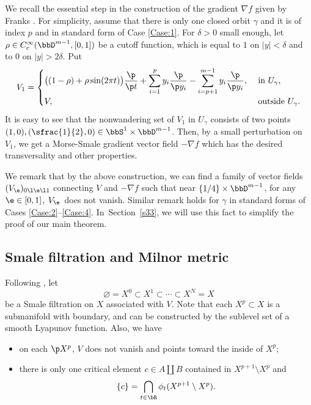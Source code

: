\begin{re}\label{reK}We recall the essential step in the
construction of the gradient $\nabla f$ given by Franks \cite[Prop.\,8.5]{Franks1982}. For simplicity, assume that there is only one
closed orbit $\gamma$ and it is of index $p$ and in standard
form of Case \ref{Case:1}.
For $\delta>0$ small enough, let $\rho\in
C^{\infty}_{c}(\bbD^{m-1},[0,1])$
be a cutoff function, which is equal to
$1$ on $|y|<\delta$ and to $0$ on $|y|>2\delta$. Put
\begin{equation*}
V_{1}=
\begin{cases}
\displaystyle
\big((1-\rho)+\rho\sin(2\pi t)\big)\frac{\p}{\p t}+\sum_{i=1}^{p}y_{i}\frac{\p}{\p
y_{i}}-\sum_{i=p+1}^{m-1}y_{i}\frac{\p}{\p y_{i}}, &\hbox{ in
} U_{\gamma},\\
V,& \hbox{ outside } U_{\gamma}.
\end{cases}
\end{equation*}
It is easy to see that the
nonwandering set of $V_{1}$ in $U_{\gamma}$ consists of two
points $(1,0),(\sfrac{1}{2},0)\in
\bbS^{1}\times \bbD^{m-1}$. Then, by a small perturbation on $V_{1}$, we get a Morse-Smale gradient vector
field $-\nabla f$ which
has the desired transversality and other properties.

We remark that by the above construction, we can find a family of vector fields $(V_{\e})_{0\l\e\l1}$ connecting $V$ and
$-\nabla f$ such that near $\{1/4\}\times \bbD^{m-1}$, for
any $ \e\in [0,1]$, $V_{\e}$~does not vanish.
Similar remark holds for $\gamma$ in standard forms of Cases \ref{Case:2}--\ref{Case:4}.
In~Section~\ref{s33}, we will use this fact to simplify the proof of our main theorem.
\end{re}

\subsection{Smale filtration and Milnor metric}\label{sSF}
Following \cite[Def.\,9.10]{Franks1982},
let
\begin{equation}\label{eqSmale}
\varnothing=X^{0}\subset X^{1}\subset\cdots \subset X^{N}=X
\end{equation}
be a Smale filtration on $X$ associated with $V$. Note that each
$X^{p}\subset X$ is a submanifold with boundary, and can be constructed by the sublevel set of a smooth Lyapunov function. Also, we
have
\begin{itemize}
\item on each $\p X^{p}$, $V$ does not vanish and points toward the inside of $X^{p}$;
\item there is only one critical element $c\in A\coprod
B$ contained in $X^{p+1}\setminus
X^{p}$ and
\begin{equation*}
\{c\}=\bigcap_{t\in \bR}\phi_{t}(X^{p+1}\setminus
X^{p}).
\end{equation*}
\end{itemize}


